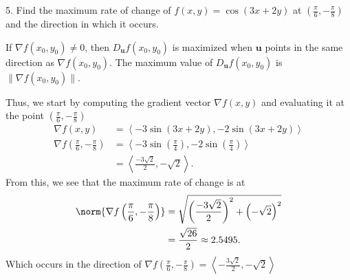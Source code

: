 \documentclass{report}
\begin{document}
    \bigbreak \noindent 
    \begin{mdframed}
        5. Find the maximum rate of change of $f(x, y) = \cos(3x + 2y)$ at $\left(\frac{\pi}{6}, -\frac{\pi}{8}\right)$ and the direction in which it occurs.
    \end{mdframed}
    \bigbreak \noindent 
    \begin{remark}
         If $\nabla f(x_0,y_0) \neq 0$, then $D_{\mathbf{u}}f(x_0,y_0)$ is maximized when $\mathbf{u}$ points in the same direction as $\nabla f(x_0,y_0)$. The maximum value of $D_{\mathbf{u}}f(x_0,y_0)$ is $\|\nabla f(x_0,y_0)\|$.
    \end{remark}
    \bigbreak \noindent 
    Thus, we start by computing the gradient vector $\nabla f(x,y)$ and evaluating it at the point $\left(\frac{\pi}{6}, -\frac{\pi}{8}\right) $
    \begin{align*}
        \nabla f(x,y) &= \left\langle -3\sin{\left(3x+2y\right)}, -2\sin{\left(3x+2y\right)} \right\rangle \\
        \nabla f\left(\frac{\pi}{6}, -\frac{\pi}{8}\right) &= \left\langle -3\sin{\left(\frac{\pi}{4}\right)}, -2\sin{\left(\frac{\pi}{4}\right)}\right\rangle \\
                                                           &= \left\langle \frac{-3\sqrt{2}}{2}, -\sqrt{2} \right\rangle
    .\end{align*}
    \bigbreak \noindent 
    From this, we see that the maximum rate of change is at 
    \begin{align*}
        \norm{\nabla f\left(\frac{\pi}{6}, -\frac{\pi}{8}\right)} &= \sqrt{\left(\frac{-3\sqrt{2}}{2}\right)^{2} + \left(-\sqrt{2}\right)^{2}} \\
        &=\frac{\sqrt{26}}{2} \approx 2.5495
    .\end{align*}
    \bigbreak \noindent 
    Which occurs in the direction of $\nabla f\left(\frac{\pi}{6}, -\frac{\pi}{8}\right) = \left\langle -\frac{3\sqrt{2}}{2}, -\sqrt{2} \right\rangle$
\end{document}
